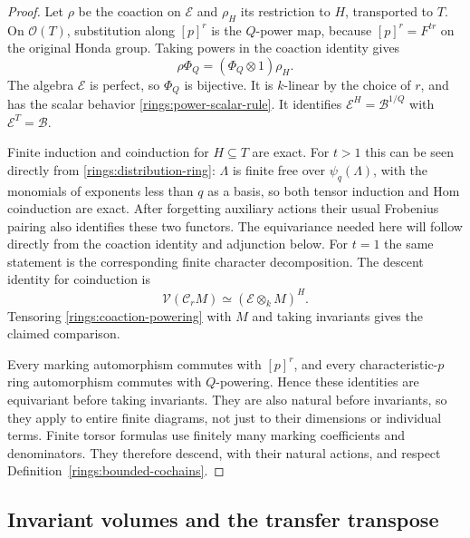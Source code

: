 \begin{proof}
Let $\rho$ be the coaction on $\mathcal E$ and $\rho_H$
its restriction to $H$, transported to $T$.  On
$\mathcal O(T)$, substitution along $[p]^r$ is the
$Q$-power map, because $[p]^r=F^{tr}$ on the original
Honda group.  Taking powers in the coaction identity
gives
\begin{equation}\label{rings:coaction-powering}
 \rho\Phi_Q=(\Phi_Q\otimes1)\rho_H.
\end{equation}
The algebra $\mathcal E$ is perfect, so $\Phi_Q$ is
bijective.  It is $k$-linear by the choice of $r$, and
has the scalar behavior \eqref{rings:power-scalar-rule}.
It identifies $\mathcal E^H=\mathcal B^{1/Q}$ with
$\mathcal E^T=\mathcal B$.

Finite induction and coinduction for $H\subseteq T$
are exact.  For $t>1$ this can be seen directly from
\eqref{rings:distribution-ring}: $\Lambda$ is finite
free over $\psi_q(\Lambda)$, with the monomials of
exponents less than $q$ as a basis, so both tensor
induction and Hom coinduction are exact.  After
forgetting auxiliary actions their usual Frobenius
pairing also identifies these two functors.  The
equivariance needed here will follow directly from
the coaction identity and adjunction below.
For $t=1$ the same statement
is the corresponding finite character decomposition.
The descent identity for coinduction is
\[
 \mathcal V(\mathcal C_rM)
   \simeq(\mathcal E\otimes_k M)^H.
\]
Tensoring \eqref{rings:coaction-powering} with $M$ and
taking invariants gives the claimed comparison.

Every marking automorphism commutes with $[p]^r$,
and every characteristic-$p$ ring automorphism
commutes with $Q$-powering.  Hence these identities
are equivariant before taking invariants.  They are
also natural before invariants, so they apply to
entire finite diagrams, not just to their dimensions
or individual terms.  Finite torsor formulas use
finitely many marking coefficients and denominators.
They therefore descend, with their natural actions,
and respect Definition~\ref{rings:bounded-cochains}.
\end{proof}

\subsection{Invariant volumes and the transfer transpose}


